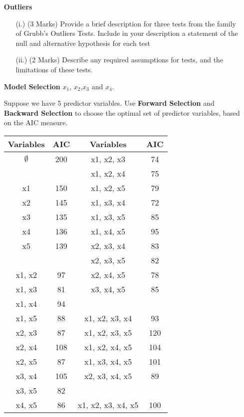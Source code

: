 \documentclass[]{report}
\begin{document}
\begin{enumerate}
\item [\textbf{Outliers}]
\begin{itemize}
	\item[(i.)] (3 Marks) Provide a brief description for three tests from the family of Grubb's  Outliers Tests. Include in your description a statement of the null and alternative hypothesis for each test
	\item[(ii.)] (2 Marks) Describe any required assumptions for tests, and the limitations of these tests.
\end{itemize}
\item [\textbf{Model Selection}]
$x_1$, $x_2$,$x_3$ and $x_4$.

 Suppose we have 5 predictor variables.
Use \textbf{Forward Selection} and \textbf{Backward Selection} to choose the optimal set of predictor variables, based on the AIC measure.

{
	\large
	\begin{center}
		\begin{tabular}{||c|c||c|c||}
			\hline
			Variables & AIC & Variables & AIC \\ \hline \hline
			$\emptyset$	&	200	&	x1, x2, x3	&	74	\\ \hline
			\phantom{makemakespace}
			&	\phantom{makespace}
			&	x1, x2, x4	&	75	\\ \hline
			x1	&	150	&	x1, x2, x5	&	79	\\ \hline
			x2	&	145	&	x1, x3, x4	&	72	\\ \hline
			x3	&	135	&	x1, x3, x5	&	85	\\ \hline
			x4	&	136	&	x1, x4, x5	&	95	\\ \hline
			x5	&	139	&	x2, x3, x4	&	83	\\ \hline
			&		&	x2, x3, x5	&	82	\\ \hline
			x1, x2	&	97	&	x2, x4, x5	&	78	\\ \hline
			x1, x3	&	81	&	x3, x4, x5	&	85	\\ \hline
			x1, x4	&	94	&	\phantom{makemakespace}
			&	\phantom{makespace}
			\\ \hline
			x1, x5	&	88	&	x1, x2, x3, x4	&	93	\\ \hline
			x2, x3	&	87	&	x1, x2, x3, x5	&	120	\\ \hline
			x2, x4	&	108	&	x1, x2, x4, x5	&	104	\\ \hline
			x2, x5	&	87	&	x1, x3, x4, x5	&	101	\\ \hline
			x3, x4	&	105	&	x2, x3, x4, x5	&	89	\\ \hline
			x3, x5	&	82	&		&		\\ \hline
			x4, x5	&	86	&	x1, x2, x3, x4, x5	&	100	\\ \hline
		\end{tabular} 
	\end{center}
}



\end{enumerate}
\end{document}
